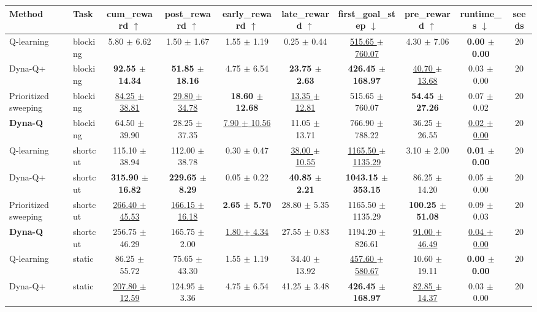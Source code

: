 \begin{tabular}{llcccccccc}
\toprule
Method & Task & cum\_reward $\uparrow$ & post\_reward $\uparrow$ & early\_reward $\uparrow$ & late\_reward $\uparrow$ & first\_goal\_step $\downarrow$ & pre\_reward $\uparrow$ & runtime\_s $\downarrow$ & seeds \\
\midrule
Q-learning & blocking & 5.80 $\pm$ 6.62 & 1.50 $\pm$ 1.67 & 1.55 $\pm$ 1.19 & 0.25 $\pm$ 0.44 & \underline{515.65 $\pm$ 760.07} & 4.30 $\pm$ 7.06 & \textbf{0.00 $\pm$ 0.00} & 20 \\
Dyna-Q+ & blocking & \textbf{92.55 $\pm$ 14.34} & \textbf{51.85 $\pm$ 18.16} & 4.75 $\pm$ 6.54 & \textbf{23.75 $\pm$ 2.63} & \textbf{426.45 $\pm$ 168.97} & \underline{40.70 $\pm$ 13.68} & 0.03 $\pm$ 0.00 & 20 \\
Prioritized sweeping & blocking & \underline{84.25 $\pm$ 38.81} & \underline{29.80 $\pm$ 34.78} & \textbf{18.60 $\pm$ 12.68} & \underline{13.35 $\pm$ 12.81} & 515.65 $\pm$ 760.07 & \textbf{54.45 $\pm$ 27.26} & 0.07 $\pm$ 0.02 & 20 \\
\textbf{Dyna-Q} & blocking & 64.50 $\pm$ 39.90 & 28.25 $\pm$ 37.35 & \underline{7.90 $\pm$ 10.56} & 11.05 $\pm$ 13.71 & 766.90 $\pm$ 788.22 & 36.25 $\pm$ 26.55 & \underline{0.02 $\pm$ 0.00} & 20 \\
\midrule
Q-learning & shortcut & 115.10 $\pm$ 38.94 & 112.00 $\pm$ 38.78 & 0.30 $\pm$ 0.47 & \underline{38.00 $\pm$ 10.55} & \underline{1165.50 $\pm$ 1135.29} & 3.10 $\pm$ 2.00 & \textbf{0.01 $\pm$ 0.00} & 20 \\
Dyna-Q+ & shortcut & \textbf{315.90 $\pm$ 16.82} & \textbf{229.65 $\pm$ 8.29} & 0.05 $\pm$ 0.22 & \textbf{40.85 $\pm$ 2.21} & \textbf{1043.15 $\pm$ 353.15} & 86.25 $\pm$ 14.20 & 0.05 $\pm$ 0.00 & 20 \\
Prioritized sweeping & shortcut & \underline{266.40 $\pm$ 45.53} & \underline{166.15 $\pm$ 16.18} & \textbf{2.65 $\pm$ 5.70} & 28.80 $\pm$ 5.35 & 1165.50 $\pm$ 1135.29 & \textbf{100.25 $\pm$ 51.08} & 0.09 $\pm$ 0.03 & 20 \\
\textbf{Dyna-Q} & shortcut & 256.75 $\pm$ 46.29 & 165.75 $\pm$ 2.00 & \underline{1.80 $\pm$ 4.34} & 27.55 $\pm$ 0.83 & 1194.20 $\pm$ 826.61 & \underline{91.00 $\pm$ 46.49} & \underline{0.04 $\pm$ 0.00} & 20 \\
\midrule
Q-learning & static & 86.25 $\pm$ 55.72 & 75.65 $\pm$ 43.30 & 1.55 $\pm$ 1.19 & 34.40 $\pm$ 13.92 & \underline{457.60 $\pm$ 580.67} & 10.60 $\pm$ 19.11 & \textbf{0.00 $\pm$ 0.00} & 20 \\
Dyna-Q+ & static & \underline{207.80 $\pm$ 12.59} & 124.95 $\pm$ 3.36 & 4.75 $\pm$ 6.54 & 41.25 $\pm$ 3.48 & \textbf{426.45 $\pm$ 168.97} & \underline{82.85 $\pm$ 14.37} & 0.03 $\pm$ 0.00 & 20 \\

\end{tabular}
